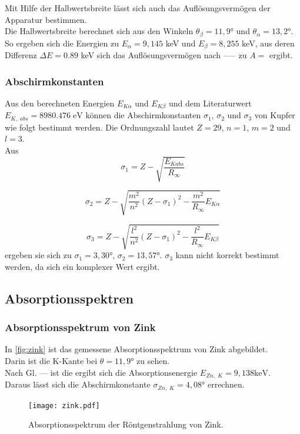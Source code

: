 Mit Hilfe der Halbwertsbreite lässt sich auch das Auflösungsvermögen der Apparatur bestimmen. \\
Die Halbwertsbreite berechnet sich aus den Winkeln $\theta_\beta = 11,9°$ und $\theta_\alpha = 13,2°$.\\
So ergeben sich die Energien zu $E_\alpha = 9,145$ keV und $E_\beta = 8,255$ keV, aus deren Differenz $\Delta E = 0.89$ keV sich das Auflösungsvermögen
nach ----- zu $A = $ ergibt.


\subsubsection*{Abschirmkonstanten}

Aus den berechneten Energien $E_{K \alpha}$ und $E_{K \beta}$ und dem Literaturwert $E_{K,\;abs} = 8980.476 \; \mathrm{eV}$ können die 
Abschirmkonstanten $\sigma_1$, $\sigma_2$ und $\sigma_3$ von Kupfer wie folgt bestimmt werden. Die Ordnungszahl lautet $Z = 29$, $n=1$, $m=2$ und $l=3$. \\
Aus 
\begin{equation*}
  \sigma_1=Z-\sqrt{\frac{E_{Kabs}}{R_\infty}}
  \end{equation*}
  
  \begin{equation*}
  \sigma_2=Z-\sqrt{ \frac{m^2}{n^2}(Z-\sigma_1)^2 - \frac{m^2}{R_\infty} E_{K\alpha}}
  \end{equation*}
  
  \begin{equation*}
      \sigma_3=Z-\sqrt{ \frac{l^2}{n^2}(Z-\sigma_1)^2 - \frac{l^2}{R_\infty} E_{K\beta}}
  \end{equation*}
ergeben sie sich zu $\sigma_1 = 3,30°$, $\sigma_2 = 13,57°$. 
$\sigma_3$ kann nicht korrekt bestimmt werden, da sich ein komplexer Wert ergibt.




\subsection{Absorptionsspektren}
\label{subsec:absorptionsspektrum}


\subsubsection*{Absorptionsspektrum von Zink}
In \autoref{fig:zink} ist das gemessene Absorptionsspektrum von Zink abgebildet.\\
Darin ist die K-Kante bei $\theta = 11,9°$ zu sehen. \\
Nach Gl. --- ist die ergibt sich die Absorptionsenergie $E_{Zn, \; K} = 9,138 \mathrm{ keV}$.\\
Daraus lässt sich die Abschirmkonstante $\sigma_{Zn, \; K} = 4,08°$ errechnen.
\begin{figure}
  \centering
  \texttt{[image: zink.pdf]}
  \caption{Absorptionsspektrum der Röntgenstrahlung von Zink.}
  \label{fig:zink}
\end{figure}



